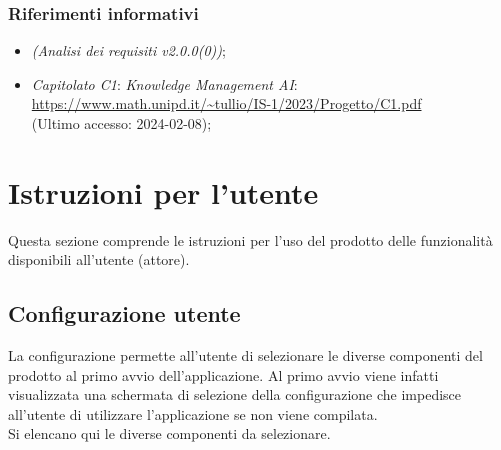 \documentclass[10pt, a4paper]{article}
\begin{document}
\subsubsection{Riferimenti informativi}
\begin{itemize}
        \item \textit{(Analisi dei requisiti v2.0.0(0))};
        \item \textit{Capitolato C1}: \textit{Knowledge Management AI}: \\ \url{https://www.math.unipd.it/~tullio/IS-1/2023/Progetto/C1.pdf}\\
        (Ultimo accesso: 2024-02-08);
   
        \end{itemize}

\newpage


\section{Istruzioni per l'utente}
Questa sezione comprende le istruzioni per l'uso del prodotto delle funzionalità disponibili all'utente (attore).
\subsection{Configurazione utente}
La configurazione permette all'utente di selezionare le diverse componenti del prodotto al primo avvio dell'applicazione. Al primo avvio viene infatti visualizzata una schermata di selezione della configurazione che impedisce all'utente di utilizzare l'applicazione se non viene compilata.\\ Si elencano qui le diverse componenti da selezionare.
\end{document}
